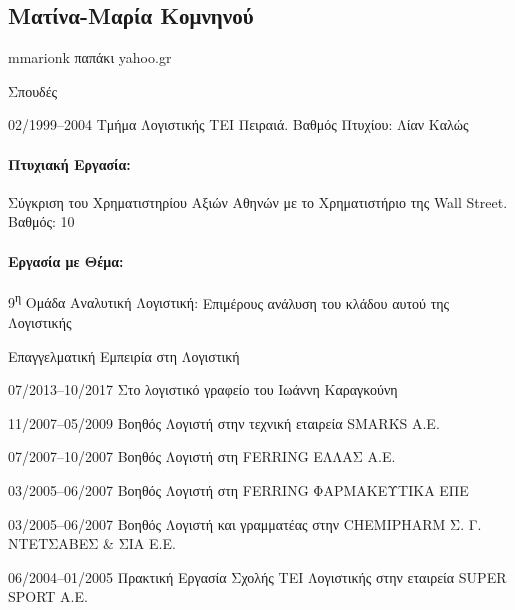 \documentclass[a4paper]{article}
\begin{document}

\begin{cv}{}

\begin{center}
  \section*{Ματίνα-Μαρία Κομνηνού}
  mmarionk παπάκι yahoo.gr
\end{center}

\begin{cvlist}{Σπουδές}
  \item[02/1999–2004] \textsf{Τμήμα Λογιστικής} ΤΕΙ Πειραιά.
                      Βαθμός Πτυχίου: Λίαν Καλώς
\end{cvlist}

\paragraph{Πτυχιακή Εργασία:} \textsf{Σύγκριση του
Χρηματιστηρίου Αξιών Αθηνών με το Χρηματιστήριο της Wall
Street.} Βαθμός: 10

\paragraph{Εργασία με Θέμα:} \textsf{9\textsuperscript{η}
Ομάδα Αναλυτική Λογιστική:} Επιμέρους ανάλυση του κλάδου
αυτού της Λογιστικής

\begin{cvlist}{Επαγγελματική Εμπειρία στη Λογιστική}
  \item[07/2013–10/2017] Στο λογιστικό γραφείο του
                         \textsf{Ιωάννη Καραγκούνη}
  \item[11/2007–05/2009] Βοηθός Λογιστή στην τεχνική
                         εταιρεία \textsf{SMARKS Α.Ε.}
  \item[07/2007–10/2007] Βοηθός Λογιστή στη \textsf{FERRING
                         ΕΛΛΑΣ Α.Ε.}
  \item[03/2005–06/2007] Βοηθός Λογιστή στη \textsf{FERRING
                          ΦΑΡΜΑΚΕΥΤΙΚΑ ΕΠΕ}
  \item[03/2005–06/2007] Βοηθός Λογιστή και γραμματέας στην
                         \textsf{CHE\-MI\-PHARM Σ. Γ.
                         ΝΤΕΤΣΑΒΕΣ \& ΣΙΑ Ε.Ε.}
  \item[06/2004–01/2005] Πρακτική Εργασία Σχολής ΤΕΙ
                         Λογιστικής στην εταιρεία
                         \textsf{SUPER SPORT Α.Ε.}
\end{cvlist}


\end{cv}
\end{document}
